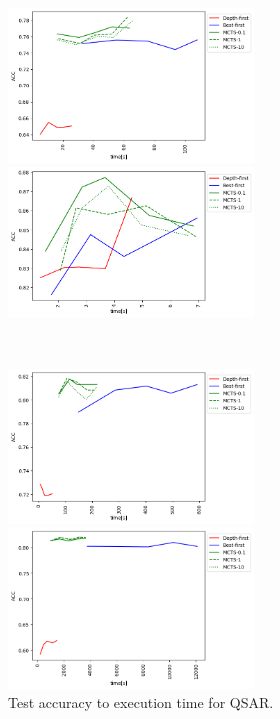 \begin{figure}[htbp]
 \begin{minipage}{0.5\hsize}
  \begin{center}
   \includegraphics[width=65mm]{img/cpdb/grid/acc_time.png}
  \end{center}
 \end{minipage}
 \begin{minipage}{0.5\hsize}
  \begin{center}
   \includegraphics[width=65mm]{img/mutag/grid/acc_time.png}
  \end{center}
 \end{minipage}\\
 \begin{minipage}{0.5\hsize}
  \begin{center}
   \includegraphics[width=65mm]{img/aids/grid/acc_time.png}
  \end{center}
 \end{minipage}
 \begin{minipage}{0.5\hsize}
  \begin{center}
   \includegraphics[width=65mm]{img/cas/grid/acc_time.png}
  \end{center}
 \end{minipage}
 \caption{Test accuracy to execution time for QSAR.}
  \label{fig:acc_time}
\end{figure}

